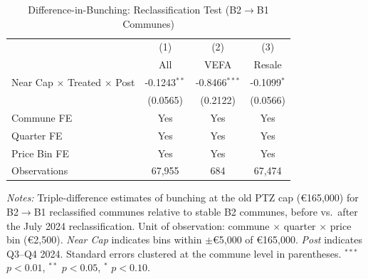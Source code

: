 \begin{table}[H]
\centering
\caption{Difference-in-Bunching: Reclassification Test (B2$\to$B1 Communes)}
\label{tab:dib}
\begin{threeparttable}
\begin{tabular}{lccc}
\toprule
 & (1) & (2) & (3) \\
 & All & VEFA & Resale \\
\midrule
Near Cap $\times$ Treated $\times$ Post & -0.1243$^{**}$ & -0.8466$^{***}$ & -0.1099$^{*}$ \\
 & (0.0565) & (0.2122) & (0.0566) \\[6pt]
Commune FE & Yes & Yes & Yes \\
Quarter FE & Yes & Yes & Yes \\
Price Bin FE & Yes & Yes & Yes \\
Observations & 67,955 & 684 & 67,474 \\
\bottomrule
\end{tabular}
\begin{tablenotes}[flushleft]
\small
\item \textit{Notes:} Triple-difference estimates of bunching at the old PTZ cap (\euro165,000) for B2$\to$B1 reclassified communes relative to stable B2 communes, before vs.\ after the July 2024 reclassification. Unit of observation: commune $\times$ quarter $\times$ price bin (\euro2,500). \textit{Near Cap} indicates bins within $\pm$\euro5,000 of \euro165,000. \textit{Post} indicates Q3--Q4 2024. Standard errors clustered at the commune level in parentheses. $^{***}$ $p<0.01$, $^{**}$ $p<0.05$, $^{*}$ $p<0.10$.
\end{tablenotes}
\end{threeparttable}
\end{table}
